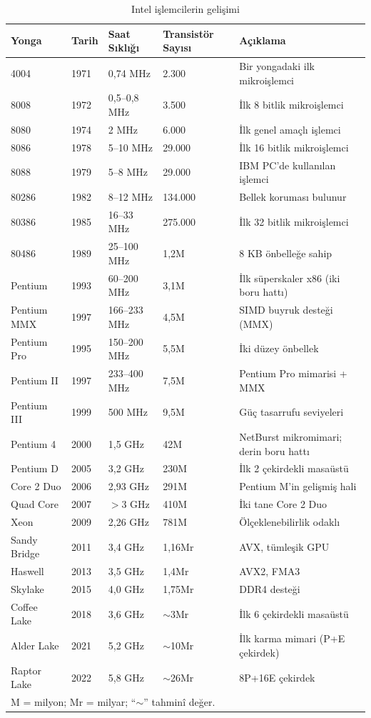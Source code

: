 \begin{table}[ht!]
\centering
\caption{Intel işlemcilerin gelişimi}
\label{tab:intel-gelisim}
\footnotesize
\begin{tabular}{llllp{5cm}}
\toprule
\textbf{Yonga} & \textbf{Tarih} & \textbf{Saat Sıklığı} & \textbf{Transistör Sayısı} & \textbf{Açıklama} \\
\midrule
4004       & 1971 & 0,74 MHz   & 2.300   & Bir yongadaki ilk mikroişlemci \\
8008       & 1972 & 0,5--0,8 MHz & 3.500   & İlk 8 bitlik mikroişlemci \\
8080       & 1974 & 2 MHz      & 6.000   & İlk genel amaçlı işlemci \\
8086       & 1978 & 5--10 MHz  & 29.000  & İlk 16 bitlik mikroişlemci \\
8088       & 1979 & 5--8 MHz   & 29.000  & IBM PC'de kullanılan işlemci \\
80286      & 1982 & 8--12 MHz  & 134.000 & Bellek koruması bulunur \\
80386      & 1985 & 16--33 MHz & 275.000 & İlk 32 bitlik mikroişlemci \\
80486      & 1989 & 25--100 MHz& 1,2M    & 8 KB önbelleğe sahip \\
Pentium    & 1993 & 60--200 MHz& 3,1M    & İlk süperskaler x86 (iki boru hattı) \\
Pentium MMX& 1997 & 166--233 MHz& 4,5M   & SIMD buyruk desteği (MMX) \\
Pentium Pro& 1995 & 150--200 MHz& 5,5M   & İki düzey önbellek \\
Pentium II & 1997 & 233--400 MHz& 7,5M   & Pentium Pro mimarisi + MMX \\
Pentium III& 1999 & 500 MHz    & 9,5M    & Güç tasarrufu seviyeleri \\
Pentium 4  & 2000 & 1,5 GHz    & 42M     & NetBurst mikromimari; derin boru hattı \\
Pentium D  & 2005 & 3,2 GHz    & 230M    & İlk 2 çekirdekli masaüstü \\
Core 2 Duo & 2006 & 2,93 GHz   & 291M    & Pentium M'in gelişmiş hali \\
Quad Core  & 2007 & $>$3 GHz   & 410M    & İki tane Core 2 Duo \\
Xeon       & 2009 & 2,26 GHz   & 781M    & Ölçeklenebilirlik odaklı \\
Sandy Bridge & 2011 & 3,4 GHz   & 1,16Mr & AVX, tümleşik GPU \\
Haswell    & 2013 & 3,5 GHz    & 1,4Mr  & AVX2, FMA3 \\
Skylake    & 2015 & 4,0 GHz    & 1,75Mr & DDR4 desteği \\
Coffee Lake& 2018 & 3,6 GHz    & ${\sim}$3Mr & İlk 6 çekirdekli masaüstü \\
Alder Lake & 2021 & 5,2 GHz    & ${\sim}$10Mr & İlk karma mimari (P+E çekirdek) \\
Raptor Lake& 2022 & 5,8 GHz    & ${\sim}$26Mr & 8P+16E çekirdek \\
\bottomrule
\multicolumn{5}{l}{\scriptsize M = milyon; Mr = milyar; ``${\sim}$'' tahminî değer.}
\end{tabular}
\end{table}

